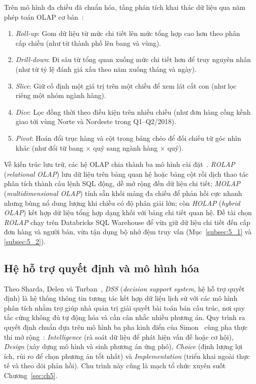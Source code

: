 \documentclass[a4paper]{article}
\begin{document}
Trên mô hình đa chiều đã chuẩn hóa, tầng phân tích khai thác dữ liệu qua năm phép toán OLAP cơ bản~\cite{bib:kimball2013,bib:turban_dss}:
\begin{enumerate}
  \item \textit{Roll-up}: Gom dữ liệu từ mức chi tiết lên mức tổng hợp cao hơn theo phân cấp chiều (như từ thành phố lên bang và vùng).
  \item \textit{Drill-down}: Đi sâu từ tổng quan xuống mức chi tiết hơn để truy nguyên nhân (như từ tỷ lệ đánh giá xấu theo năm xuống tháng và ngày).
  \item \textit{Slice}: Giữ cố định một giá trị trên một chiều để xem lát cắt con (như lọc riêng một nhóm ngành hàng).
  \item \textit{Dice}: Lọc đồng thời theo điều kiện trên nhiều chiều (như đơn hàng cồng kềnh giao tới vùng Norte và Nordeste trong Q1--Q2/2018).
  \item \textit{Pivot}: Hoán đổi trục hàng và cột trong bảng chéo để đối chiếu từ góc nhìn khác (như đổi từ bang $\times$ quý sang ngành hàng $\times$ quý).
\end{enumerate}

Về kiến trúc lưu trữ, các hệ OLAP chia thành ba mô hình cài đặt~\cite{bib:turban_dss}. \textit{ROLAP} (\textit{relational OLAP}) lưu dữ liệu trên bảng quan hệ hoặc bảng cột rồi dịch thao tác phân tích thành câu lệnh SQL động, dễ mở rộng đến dữ liệu chi tiết; \textit{MOLAP} (\textit{multidimensional OLAP}) tính sẵn khối mảng đa chiều để phản hồi cực nhanh nhưng bùng nổ dung lượng khi chiều có độ phân giải lớn; còn \textit{HOLAP} (\textit{hybrid OLAP}) kết hợp dữ liệu tổng hợp dạng khối với bảng chi tiết quan hệ. Đề tài chọn \textit{ROLAP} chạy trên Databricks SQL Warehouse để vừa giữ dữ liệu chi tiết đến cấp đơn hàng và người bán, vừa tận dụng bộ nhớ đệm truy vấn (Mục~\ref{subsec:5_1} và \ref{subsec:5_2}).

\subsection{Hệ hỗ trợ quyết định và mô hình hóa}
\label{subsec:2_4}

Theo Sharda, Delen và Turban~\cite{bib:turban_dss}, \textit{DSS} (\textit{decision support system}, hệ hỗ trợ quyết định) là hệ thống thông tin tương tác kết hợp dữ liệu lịch sử với các mô hình phân tích nhằm trợ giúp nhà quản trị giải quyết bài toán bán cấu trúc, nơi quy tắc cứng không đủ tự động hóa và cần cân nhắc nhiều phương án. Quy trình ra quyết định chuẩn dựa trên mô hình ba pha kinh điển của Simon~\cite{bib:simon1960} cùng pha thực thi mở rộng~\cite{bib:turban_dss}: \textit{Intelligence} (rà soát dữ liệu để phát hiện vấn đề hoặc cơ hội), \textit{Design} (xây dựng mô hình và sinh phương án ứng phó), \textit{Choice} (định lượng lợi ích, rủi ro để chọn phương án tốt nhất) và \textit{Implementation} (triển khai ngoài thực tế và theo dõi phản hồi). Chu trình này cũng là mạch tổ chức xuyên suốt Chương~\ref{sec:ch5}.
\end{document}

